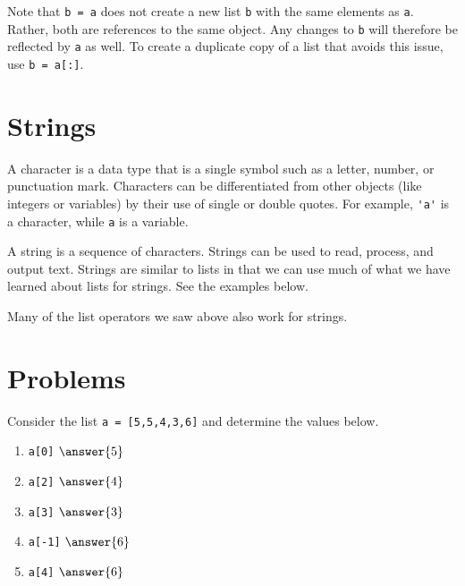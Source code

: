 \documentclass{ximera}
\begin{document}
Note that \verb|b = a| does not create a new list \verb|b| with the same elements as \verb|a|. Rather, both are references to the same object. Any changes to \verb|b| will therefore be reflected by \verb|a| as well. To create a duplicate copy of a list that avoids this issue, use \verb|b = a[:]|.

\section{Strings}

A character is a data type that is a single symbol such as a letter, number, or punctuation mark. Characters can be differentiated from other objects (like integers or variables) by their use of single or double quotes. For example, \verb|'a'| is a character, while \verb|a| is a variable.

A string is a sequence of characters. Strings can be used to read, process, and output text. Strings are similar to lists in that we can use much of what we have learned about lists for strings. See the examples below.

Many of the list operators we saw above also work for strings.



\section{Problems}

\begin{question}
Consider the list \verb|a = [5,5,4,3,6]| and determine the values below.
	\begin{enumerate}
	\item \verb|a[0]| $\answer{5}$
	\item \verb|a[2]| $\answer{4}$
	\item \verb|a[3]| $\answer{3}$
	\item \verb|a[-1]| $\answer{6}$
	\item \verb|a[4]| $\answer{6}$
	\end{enumerate}
\end{question}
\end{document}
